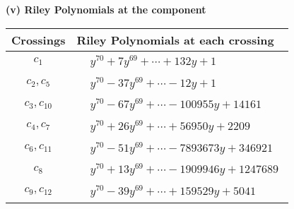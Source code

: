 \documentclass[1p]{elsarticle_modified}
\theoremstyle{definition}
\begin{document}
\flushleft \textbf{(v) Riley Polynomials at the component}\newline \\
\begin{tabular}{m{50pt}|m{274pt}}
Crossings & \hspace{64pt}Riley Polynomials at each crossing \\
\hline $$\begin{aligned}c_{1}\end{aligned}$$&$\begin{aligned}
&y^{70}+7 y^{69}+\cdots+132 y+1
\end{aligned}$\\
\hline $$\begin{aligned}c_{2},c_{5}\end{aligned}$$&$\begin{aligned}
&y^{70}-37 y^{69}+\cdots-12 y+1
\end{aligned}$\\
\hline $$\begin{aligned}c_{3},c_{10}\end{aligned}$$&$\begin{aligned}
&y^{70}-67 y^{69}+\cdots-100955 y+14161
\end{aligned}$\\
\hline $$\begin{aligned}c_{4},c_{7}\end{aligned}$$&$\begin{aligned}
&y^{70}+26 y^{69}+\cdots+56950 y+2209
\end{aligned}$\\
\hline $$\begin{aligned}c_{6},c_{11}\end{aligned}$$&$\begin{aligned}
&y^{70}-51 y^{69}+\cdots-7893673 y+346921
\end{aligned}$\\
\hline $$\begin{aligned}c_{8}\end{aligned}$$&$\begin{aligned}
&y^{70}+13 y^{69}+\cdots-1909946 y+1247689
\end{aligned}$\\
\hline $$\begin{aligned}c_{9},c_{12}\end{aligned}$$&$\begin{aligned}
&y^{70}-39 y^{69}+\cdots+159529 y+5041
\end{aligned}$\\
\hline
\end{tabular}\\~\\
\end{document}
